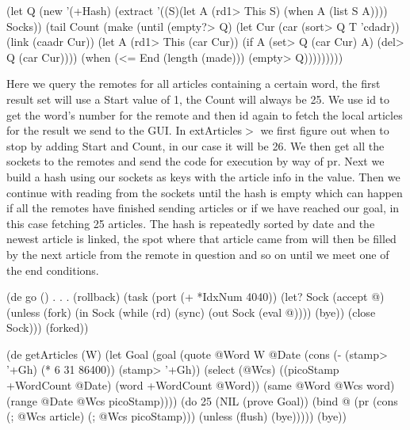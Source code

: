 \begin{wideverbatim}

      (let Q (new '(+Hash) (extract '((S)(let A (rd1> This S) (when A (list S A)))) Socks))
         (tail Count
            (make
               (until (empty?> Q)
                  (let Cur (car (sort> Q T 'cdadr))
                     (link (caadr Cur))
                     (let A (rd1> This (car Cur))
                        (if A
                           (set> Q (car Cur) A)
                           (del> Q (car Cur))))
                     (when (<= End (length (made)))
                        (empty> Q)))))))))
\end{wideverbatim}

 
Here we query the remotes for all articles containing a certain word,
the first result set will use a Start value of 1, the Count will
always be 25. We use id to get the word's number for the remote and
then id again to fetch the local articles for the result we send to
the GUI. In extArticles$>$ we first figure out when to stop by adding
Start and Count, in our case it will be 26. We then get all the
sockets to the remotes and send the code for execution by way of pr.
Next we build a hash using our sockets as keys with the article info
in the value. Then we continue with reading from the sockets until the
hash is empty which can happen if all the remotes have finished
sending articles or if we have reached our goal, in this case fetching
25 articles. The hash is repeatedly sorted by date and the newest
article is linked, the spot where that article came from will then be
filled by the next article from the remote in question and so on until
we meet one of the end conditions.
 
\begin{wideverbatim}
(de go ()
. . .
   (rollback)
   (task (port (+ *IdxNum 4040))
      (let? Sock (accept @)
         (unless (fork)
            (in Sock
               (while (rd)
                  (sync)
                  (out Sock
                     (eval @))))
            (bye))
         (close Sock)))
   (forked))

\end{wideverbatim}

\begin{wideverbatim}

(de getArticles (W)
   (let Goal
      (goal
         (quote
            @Word W
            @Date (cons (- (stamp> '+Gh) (* 6 31 86400)) (stamp> '+Gh))
            (select (@Wcs)
               ((picoStamp +WordCount @Date) (word +WordCount @Word))
               (same @Word @Wcs word)
               (range @Date @Wcs picoStamp))))
      (do 25
         (NIL (prove Goal))
         (bind @
            (pr (cons (; @Wcs article) (; @Wcs picoStamp)))
            (unless (flush) (bye)))))
   (bye))
\end{wideverbatim}

